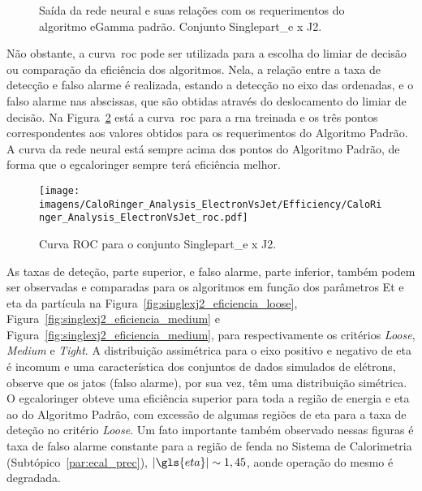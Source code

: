 \begin{figure}[htb]
\centering
{}
\label{fig:singlexj2_saidaneural}
\caption{Saída da rede neural e suas relações com os requerimentos do algoritmo
eGamma padrão. Conjunto Singlepart\_e x J2.}
\end{figure}

Não obstante, a curva~\gls{roc} pode ser utilizada para a escolha do limiar de
decisão ou comparação da eficiência dos algoritmos. Nela, a relação entre a taxa
de detecção e falso alarme é realizada, estando a detecção no eixo das
ordenadas, e o falso alarme nas abscissas, que são obtidas através do
deslocamento do limiar de decisão. Na Figura~\ref{fig:singlexj2_roc} está a
curva~\gls{roc} para a \gls{rna} treinada e os três pontos correspondentes aos
valores obtidos para os requerimentos do Algoritmo Padrão. A curva da rede
neural está sempre acima dos pontos do Algoritmo Padrão, de forma que o
\gls{egcaloringer} sempre terá eficiência melhor.

\begin{figure}[ht]
\centering
\texttt{[image: imagens/CaloRinger\_Analysis\_ElectronVsJet/Efficiency/CaloRinger\_Analysis\_ElectronVsJet\_roc.pdf]}
\label{fig:singlexj2_roc}
\caption{Curva ROC para o conjunto Singlepart\_e x J2.}
\end{figure}

As taxas de deteção, parte superior, e falso alarme, parte inferior, também podem ser 
observadas e comparadas para os algoritmos em função dos parâmetros \gls{Et} e \gls{eta} 
da partícula na Figura~\ref{fig:singlexj2_eficiencia_loose},
Figura~\ref{fig:singlexj2_eficiencia_medium} e Figura~\ref{fig:singlexj2_eficiencia_medium}, 
para respectivamente os critérios \emph{Loose}, \emph{Medium} e \emph{Tight}. A
distribuição assimétrica para o eixo positivo e negativo de \gls{eta} é incomum
e uma característica dos conjuntos de dados simulados de elétrons, observe que
os jatos (falso alarme), por sua vez, têm uma distribuição simétrica. O
\gls{egcaloringer} obteve uma eficiência superior para toda a região de energia
e \gls{eta} ao do Algoritmo Padrão, com excessão de algumas regiões de \gls{eta}
para a taxa de deteção no critério \emph{Loose}. Um fato importante também
observado nessas figuras é taxa de falso alarme constante para a região de fenda
no Sistema de Calorimetria (Subtópico~\ref{par:ecal_prec}), $|\gls{eta}|\sim1,45$, 
aonde operação do mesmo é degradada.

